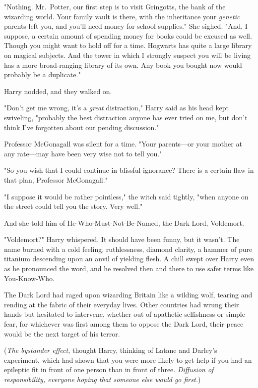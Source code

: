"Nothing. Mr.~Potter, our first step is to visit Gringotts, the bank of the
wizarding world. Your family vault is there, with the
inheritance your \emph{genetic} parents left you, and you'll need money for
school supplies." She sighed. "And, I suppose, a certain amount of spending
money for books could be excused as well. Though you might want to hold off for
a time. Hogwarts has quite a large library on magical subjects. And the tower
in which I strongly suspect you will be living has a more broad-ranging
library of its own. Any book you bought now would probably be a duplicate."

Harry nodded, and they walked on.

"Don't get me wrong, it's a \emph{great} distraction," Harry said as his head
kept swiveling, "probably the best distraction anyone has ever tried on me,
but don't think I've forgotten about our pending discussion."

Professor McGonagall was silent for a time.
"Your parents—or your mother at any rate—may
have been very wise not to tell you."

"So you wish that I could continue in blissful ignorance? There is a certain
flaw in that plan, Professor McGonagall."

"I suppose it would be rather pointless," the witch said tightly, "when anyone
on the street could tell you the story. Very well."

And she told him of He-Who-Must-Not-Be-Named, the Dark Lord, Voldemort.

"Voldemort?" Harry whispered. It should have been funny, but it wasn't. The
name burned with a cold feeling, ruthlessness, diamond clarity, a hammer of
pure titanium descending upon an anvil of yielding flesh. A chill swept over
Harry even as he pronounced the word, and he resolved then and there to use
safer terms like You-Know-Who.

The Dark Lord had raged upon wizarding Britain like a wilding wolf, tearing and
rending at the fabric of their everyday lives. Other countries had wrung their
hands but hesitated to intervene, whether out of apathetic selfishness or
simple fear, for whichever was first among them to oppose the Dark Lord, their
peace would be the next target of his terror.

(\emph{The bystander effect,} thought Harry, thinking of Latane and Darley's
experiment, which had shown that you were more likely to get help if you had an
epileptic fit in front of one person than in front of three. \emph{Diffusion of
responsibility, everyone hoping that someone else would go first.})

